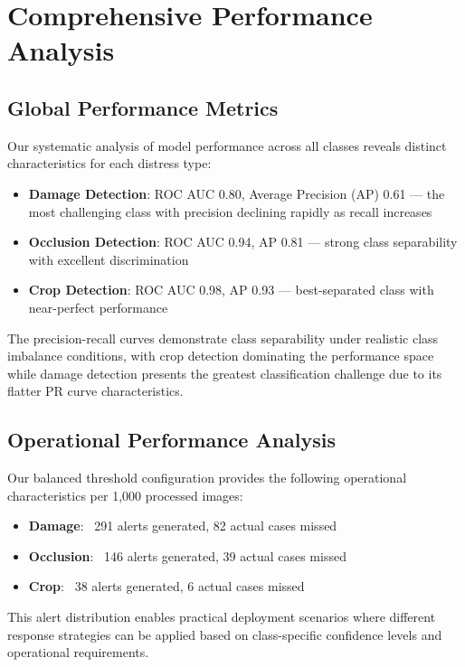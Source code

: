 \documentclass[12pt]{article}
\begin{document}
\section{Comprehensive Performance Analysis}

\subsection{Global Performance Metrics}

Our systematic analysis of model performance across all classes reveals distinct characteristics for each distress type:

\begin{itemize}[itemsep=1pt,parsep=0pt,topsep=3pt]
\item \textbf{Damage Detection}: ROC AUC 0.80, Average Precision (AP) 0.61 — the most challenging class with precision declining rapidly as recall increases
\item \textbf{Occlusion Detection}: ROC AUC 0.94, AP 0.81 — strong class separability with excellent discrimination
\item \textbf{Crop Detection}: ROC AUC 0.98, AP 0.93 — best-separated class with near-perfect performance
\end{itemize}

The precision-recall curves demonstrate class separability under realistic class imbalance conditions, with crop detection dominating the performance space while damage detection presents the greatest classification challenge due to its flatter PR curve characteristics.

\subsection{Operational Performance Analysis}

Our balanced threshold configuration provides the following operational characteristics per 1,000 processed images:

\begin{itemize}[itemsep=1pt,parsep=0pt,topsep=3pt]
\item \textbf{Damage}: ~291 alerts generated, 82 actual cases missed
\item \textbf{Occlusion}: ~146 alerts generated, 39 actual cases missed  
\item \textbf{Crop}: ~38 alerts generated, 6 actual cases missed
\end{itemize}

This alert distribution enables practical deployment scenarios where different response strategies can be applied based on class-specific confidence levels and operational requirements.
\end{document}
